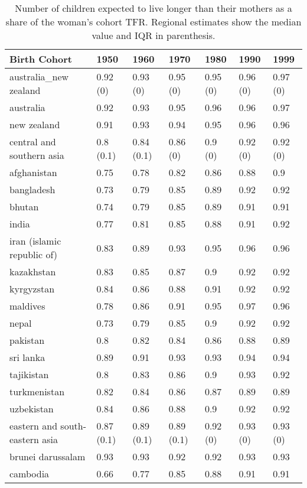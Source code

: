 \begin{table}

\caption{\label{tab:S10}Number of children expected to live longer than their mothers as a share of the woman's cohort TFR. Regional estimates show the median value and IQR in parenthesis.}
\centering
\begin{tabular}[t]{lllllll}
\toprule
Birth Cohort & 1950 & 1960 & 1970 & 1980 & 1990 & 1999\\
\midrule
australia\_new zealand & 0.92 (0) & 0.93 (0) & 0.95 (0) & 0.95 (0) & 0.96 (0) & 0.97 (0)\\
australia & 0.92 & 0.93 & 0.95 & 0.96 & 0.96 & 0.97\\
new zealand & 0.91 & 0.93 & 0.94 & 0.95 & 0.96 & 0.96\\
central and southern asia & 0.8 (0.1) & 0.84 (0.1) & 0.86 (0) & 0.9 (0) & 0.92 (0) & 0.92 (0)\\
afghanistan & 0.75 & 0.78 & 0.82 & 0.86 & 0.88 & 0.9\\
\addlinespace
bangladesh & 0.73 & 0.79 & 0.85 & 0.89 & 0.92 & 0.92\\
bhutan & 0.74 & 0.79 & 0.85 & 0.89 & 0.91 & 0.91\\
india & 0.77 & 0.81 & 0.85 & 0.88 & 0.91 & 0.92\\
iran (islamic republic of) & 0.83 & 0.89 & 0.93 & 0.95 & 0.96 & 0.96\\
kazakhstan & 0.83 & 0.85 & 0.87 & 0.9 & 0.92 & 0.92\\
\addlinespace
kyrgyzstan & 0.84 & 0.86 & 0.88 & 0.91 & 0.92 & 0.92\\
maldives & 0.78 & 0.86 & 0.91 & 0.95 & 0.97 & 0.96\\
nepal & 0.73 & 0.79 & 0.85 & 0.9 & 0.92 & 0.92\\
pakistan & 0.8 & 0.82 & 0.84 & 0.86 & 0.88 & 0.89\\
sri lanka & 0.89 & 0.91 & 0.93 & 0.93 & 0.94 & 0.94\\
\addlinespace
tajikistan & 0.8 & 0.83 & 0.86 & 0.9 & 0.93 & 0.92\\
turkmenistan & 0.82 & 0.84 & 0.86 & 0.87 & 0.89 & 0.89\\
uzbekistan & 0.84 & 0.86 & 0.88 & 0.9 & 0.92 & 0.92\\
eastern and south-eastern asia & 0.87 (0.1) & 0.89 (0.1) & 0.89 (0.1) & 0.92 (0) & 0.93 (0) & 0.93 (0)\\
brunei darussalam & 0.93 & 0.93 & 0.92 & 0.92 & 0.93 & 0.93\\
\addlinespace
cambodia & 0.66 & 0.77 & 0.85 & 0.88 & 0.91 & 0.91\\

\end{tabular}
\end{table}
